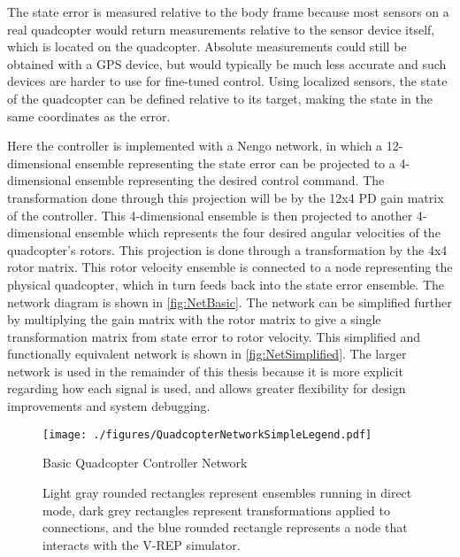 \documentclass[letterpaper,12pt,titlepage,oneside,final]{book}
\begin{document}

The state error is measured relative to the body frame because most sensors on a real quadcopter would return measurements relative to the sensor device itself, which is located on the quadcopter. Absolute measurements could still be obtained with a GPS device, but would typically be much less accurate and such devices are harder to use for fine-tuned control. Using localized sensors, the state of the quadcopter can be defined relative to its target, making the state in the same coordinates as the error.

Here the controller is implemented with a Nengo network, in which a 12-dimensional ensemble representing the state error can be projected to a 4-dimensional ensemble representing the desired control command. 
The transformation done through this projection will be by the 12x4 PD gain matrix of the controller. 
This 4-dimensional ensemble is then projected to another 4-dimensional ensemble which represents the four desired angular velocities of the quadcopter's rotors. 
This projection is done through a transformation by the 4x4 rotor matrix. 
This rotor velocity ensemble is connected to a node representing the physical quadcopter, which in turn feeds back into the state error ensemble. 
The network diagram is shown in \autoref{fig:NetBasic}. 
The network can be simplified further by multiplying the gain matrix with the rotor matrix to give a single transformation matrix from state error to rotor velocity. 
This simplified and functionally equivalent network is shown in \autoref{fig:NetSimplified}.
The larger network is used in the remainder of this thesis because it is more explicit regarding how each signal is used, and allows greater flexibility for design improvements and system debugging.

\begin{figure}
\centering
\texttt{[image: ./figures/QuadcopterNetworkSimpleLegend.pdf]} %
\caption{Basic Quadcopter Controller Network}
\label{fig:NetBasic}
\captionsetup{singlelinecheck=off,font=footnotesize}
\caption*{Light gray rounded rectangles represent ensembles running in direct mode, dark grey rectangles represent transformations applied to connections, and the blue rounded rectangle represents a node that interacts with the V-REP simulator. }
\end{figure}
\end{document}
